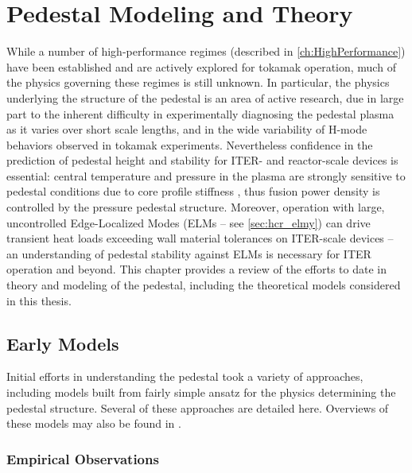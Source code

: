 \chapter{Pedestal Modeling and Theory}\label{ch:Modeling}

While a number of high-performance regimes (described in \cref{ch:HighPerformance}) have been established and are actively explored for tokamak operation, much of the physics governing these regimes is still unknown.  In particular, the physics underlying the structure of the pedestal is an area of active research, due in large part to the inherent difficulty in experimentally diagnosing the pedestal plasma as it varies over short scale lengths, and in the wide variability of H-mode behaviors observed in tokamak experiments.  Nevertheless confidence in the prediction of pedestal height and stability for ITER- and reactor-scale devices is essential: central temperature and pressure in the plasma are strongly sensitive to pedestal conditions due to core profile stiffness \cite{Greenwald2007,Hubbard1998}, thus fusion power density is controlled by the pressure pedestal structure.  Moreover, operation with large, uncontrolled Edge-Localized Modes (ELMs -- see \cref{sec:hcr_elmy}) can drive transient heat loads exceeding wall material tolerances on ITER-scale devices \cite{Loarte2003,Federici2003} -- an understanding of pedestal stability against ELMs is necessary for ITER operation and beyond.  This chapter provides a review of the efforts to date in theory and modeling of the pedestal, including the theoretical models considered in this thesis.\nicesectionending

\section{Early Models}\label{sec:mod_early}

Initial efforts in understanding the pedestal took a variety of approaches, including models built from fairly simple ansatz for the physics determining the pedestal structure.  Several of these approaches are detailed here.  Overviews of these models may also be found in \cite[\S 2]{Hubbard2000,Hughes2005}.

\subsection{Empirical Observations}\label{subsec:mod_empirical}

